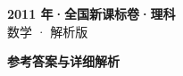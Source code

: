 \documentclass[zihao=-4, a4paper]{ctexart}
\begin{document}
\begin{center}
  {\Large\bfseries 2011 年·全国新课标卷·理科}\\[4pt]
  {\large 数学 · 解析版}
\end{center}
\medskip
{}

\clearpage
{}
\begin{center}{\Large\bfseries 参考答案与详细解析}\end{center}
\medskip

\end{document}
